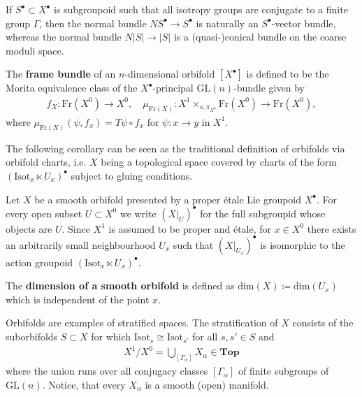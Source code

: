 \documentclass[psamsfonts]{amsart}
\theoremstyle{plain}
\theoremstyle{definition}{
\newtheorem{defi}{Definition}[section]
\newtheorem{ass}{Assumption}
\newtheorem*{nota}{Notation}}
\theoremstyle{remark}{
\newtheorem{rem}{Remark}
\newtheorem{ex}{Example}}
\theoremstyle{plain}{
\newtheorem{thm}{Theorem}[section]
\newtheorem{lem}{Lemma}[section]
\newtheorem{cor}{Corollary}[section]
\newtheorem{prop}{Proposition}[section]
\newtheorem{con}{Conjecture}[section]}
\newcommand{\m}[1]{{\mathrm{#1}}}
\newcommand{\cat}[1]{\textbf{#1}}
\begin{document}
If $S^\bullet\subset X^\bullet$ is subgroupoid such that all isotropy groups are conjugate to a finite group $\Gamma$, then the normal bundle $NS^\bullet \rightarrow S^\bullet$ is naturally an $S^\bullet$-vector bundle, whereas the normal bundle $N|S| \to |S|$ is a (quasi-)conical bundle on the coarse moduli space.

\begin{defi}
The \textbf{frame bundle} of an $n$-dimensional orbifold $[X^\bullet]$ is defined to be the Morita equivalence class of the $X^\bullet$-principal $\mathrm{GL}(n)$-bundle given by 
\begin{align*}
    f_X\colon  \m{Fr}(X^0) \rightarrow X^0,\quad 
    \mu_{\m{Fr}(X)}\colon  X^1 \times_{s, \pi_{X^0}} \m{Fr}(X^0) \rightarrow \m{Fr}(X^0),
\end{align*}
where $\mu_{\m{Fr}(X)}(\psi, f_x) = T\psi \circ f_x$ for $\psi\colon  x \to y$ in $X^1$.
\end{defi}

The following corollary can be seen as the traditional definition of orbifolds via orbifold charts, i.e. $X$ being a topological space covered by charts of the form $(\m{Isot}_x\ltimes U_x)^\bullet$ subject to gluing conditions.

\begin{cor}\cite[Sec. 3.4]{moerdijk2002orbifolds}
Let $X$ be a smooth orbifold presented by a proper étale Lie groupoid $X^\bullet$. For every open subset $U\subset X^0$ we write $(X|_U)^\bullet$ for the full subgroupid whose objects are $U$. Since $X^1$ is assumed to be proper and étale, for $x\in X^0$ there exists an arbitrarily small neighbourhood $U_x$ such that $(X|_{U_x})^\bullet$ is isomorphic to the action groupoid $(\m{Isot}_x\ltimes U_x)^\bullet$. 
\end{cor}

\begin{defi}
    The \textbf{dimension of a smooth orbifold} is defined as $ \m{dim}(X)\coloneqq \m{dim}(U_x)$ which is independent of the point $x$.
\end{defi}

Orbifolds are examples of stratified spaces. The stratification of $X$ consists of the suborbifolds $S\subset X$ for which $\m{Isot}_s\cong\m{Isot}_{s'}$ for all $s,s'\in S$ and
\begin{align*}
    X^1/X^0=\bigcup_{[ \Gamma_\alpha]}X_\alpha\in\cat{Top}
\end{align*}
where the union runs over all conjugacy classes $[ \Gamma_\alpha]$ of finite subgroups of $\m{GL}(n)$. Notice, that every $X_\alpha$ is a smooth (open) manifold.\\ 
\end{document}
